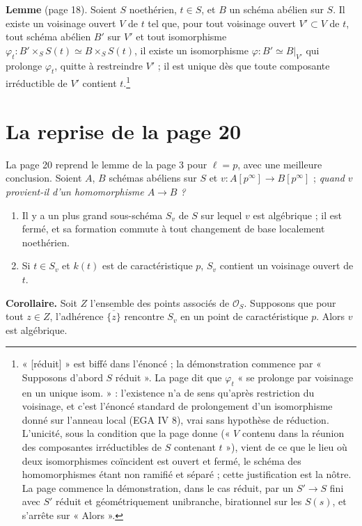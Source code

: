 \documentclass[11pt,a4paper]{article}
\begin{document}
\textbf{Lemme} (page 18). Soient $S$ noethérien, $t \in S$, et $B$ un
schéma abélien sur $S$. Il existe un voisinage ouvert $V$ de $t$ tel que, pour
tout voisinage ouvert $V' \subset V$ de $t$, tout schéma abélien $B'$ sur $V'$
et tout isomorphisme $\varphi_t : B' \times_S S(t) \simeq B \times_S S(t)$, il
existe un isomorphisme $\varphi : B' \simeq B|_{V'}$ qui prolonge
$\varphi_t$, quitte à restreindre $V'$ ; il est unique dès que toute
composante irréductible de $V'$ contient $t$.\footnote{« [réduit] » est
biffé dans l'énoncé ; la démonstration commence par « Supposons d'abord $S$
réduit ». La page dit que $\varphi_t$ « se prolonge par voisinage en un unique
isom. » : l'existence n'a de sens qu'après restriction du voisinage, et c'est
l'énoncé standard de prolongement d'un isomorphisme donné sur l'anneau local
(EGA IV 8), vrai sans hypothèse de réduction. L'unicité, sous la condition
que la page donne (« $V$ contenu dans la réunion des composantes
irréductibles de $S$ contenant $t$ »), vient de ce que le lieu où deux
isomorphismes coïncident est ouvert et fermé, le schéma des homomorphismes
étant non ramifié et séparé ; cette justification est la nôtre. La page
commence la démonstration, dans le cas réduit, par un $S' \to S$ fini avec
$S'$ réduit et géométriquement unibranche, birationnel sur les $S(s)$, et
s'arrête sur « Alors ».}

\section*{La reprise de la page 20}

La page 20 reprend le lemme de la page 3 pour $\ell = p$, avec une meilleure
conclusion. Soient $A$, $B$ schémas abéliens sur $S$ et
$v : A[p^\infty] \to B[p^\infty]$ ; \emph{quand $v$ provient-il d'un
homomorphisme $A \to B$ ?}

\begin{enumerate}
  \item[a)] Il y a un plus grand sous-schéma $S_v$ de $S$ sur lequel $v$ est
  algébrique ; il est fermé, et sa formation commute à tout changement de base
  localement noethérien.
  \item[b)] Si $t \in S_v$ et $k(t)$ est de caractéristique $p$, $S_v$
  contient un voisinage ouvert de $t$.
\end{enumerate}

\textbf{Corollaire.} Soit $Z$ l'ensemble des points associés de
$\mathcal{O}_S$. Supposons que pour tout $z \in Z$, l'adhérence
$\overline{\{z\}}$ rencontre $S_v$ en un point de caractéristique $p$. Alors
$v$ est algébrique.
\end{document}
